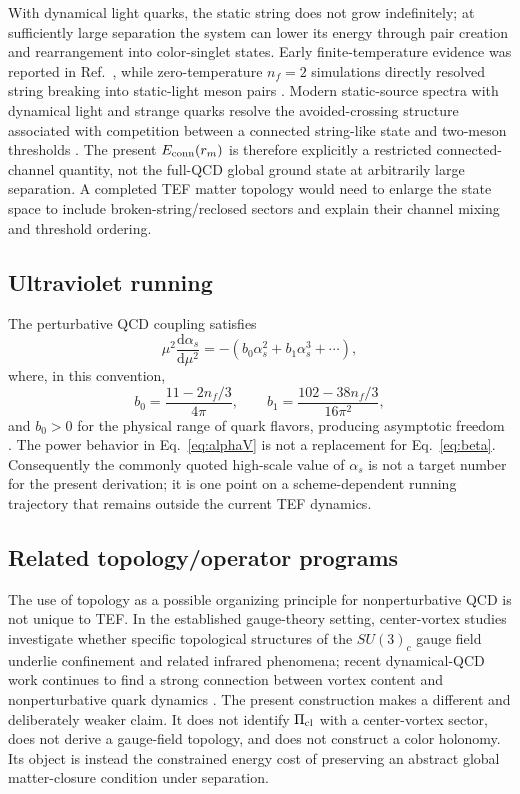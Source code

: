 \documentclass[10pt]{article}
\newcommand{\dd}{\mathrm{d}}
\begin{document}
With dynamical light quarks, the static string does not grow indefinitely; at sufficiently large separation the system can lower its energy through pair creation and rearrangement into color-singlet states. Early finite-temperature evidence was reported in Ref.~\cite{DeTar1999}, while zero-temperature $n_f=2$ simulations directly resolved string breaking into static-light meson pairs \cite{BaliStringBreaking2005}. Modern static-source spectra with dynamical light and strange quarks resolve the avoided-crossing structure associated with competition between a connected string-like state and two-meson thresholds \cite{Bulava2024}. The present $E_{\rm conn}(r_m)$ is therefore explicitly a restricted connected-channel quantity, not the full-QCD global ground state at arbitrarily large separation. A completed TEF matter topology would need to enlarge the state space to include broken-string/reclosed sectors and explain their channel mixing and threshold ordering.

\subsection{Ultraviolet running}

The perturbative QCD coupling satisfies
\begin{equation}
\mu^2\frac{\dd\alpha_s}{\dd\mu^2}
=-(b_0\alpha_s^2+b_1\alpha_s^3+\cdots),
\label{eq:beta}
\end{equation}
where, in this convention,
\begin{equation}
b_0=\frac{11-2n_f/3}{4\pi},
\qquad
b_1=\frac{102-38n_f/3}{16\pi^2},
\end{equation}
and $b_0>0$ for the physical range of quark flavors, producing asymptotic freedom \cite{PDGQCD2025}.  The power behavior in Eq.~\eqref{eq:alphaV} is not a replacement for Eq.~\eqref{eq:beta}.  Consequently the commonly quoted high-scale value of $\alpha_s$ is not a target number for the present derivation; it is one point on a scheme-dependent running trajectory that remains outside the current TEF dynamics.


\subsection{Related topology/operator programs}

The use of topology as a possible organizing principle for nonperturbative QCD is not unique to TEF. In the established gauge-theory setting, center-vortex studies investigate whether specific topological structures of the $SU(3)_c$ gauge field underlie confinement and related infrared phenomena; recent dynamical-QCD work continues to find a strong connection between vortex content and nonperturbative quark dynamics \cite{Virgili2025}. The present construction makes a different and deliberately weaker claim. It does not identify $\Pi_{\rm cl}$ with a center-vortex sector, does not derive a gauge-field topology, and does not construct a color holonomy. Its object is instead the constrained energy cost of preserving an abstract global matter-closure condition under separation.
\end{document}
